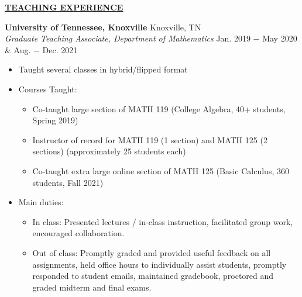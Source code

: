 \documentclass{article}
\begin{document}
\begin{center}
    \textbf{\underline{TEACHING EXPERIENCE}}
\end{center}
\textbf{University of Tennessee, Knoxville}
  \hfill Knoxville, TN
\\
\textit{Graduate Teaching Associate, Department of Mathematics}
  \hfill Jan. 2019 $-$ May 2020 \& Aug. $-$ Dec. 2021
\begin{itemize}[noitemsep,nolistsep,leftmargin=*]
    \item Taught several classes in hybrid/flipped format
    \item Courses Taught:
        \begin{itemize}[noitemsep,nolistsep,leftmargin=*]
            \item Co-taught large section of MATH 119 (College Algebra, 40+ students, Spring 2019)
            \item Instructor of record for MATH 119 (1 section) and MATH 125 (2 sections) (approximately 25 students each)
            \item Co-taught extra large online section of MATH 125 (Basic Calculus, 360 students, Fall 2021)
        \end{itemize}
    \item Main duties:
        \begin{itemize}[noitemsep,nolistsep,leftmargin=*]
            \item In class: Presented lectures / in-class instruction, facilitated group work, encouraged collaboration.
            \item Out of class: Promptly graded and provided useful feedback on all assignments, held office hours to individually assist students, promptly responded to student emails, maintained gradebook, proctored and graded midterm and final exams. \\
        \end{itemize}
\end{itemize}
\end{document}
